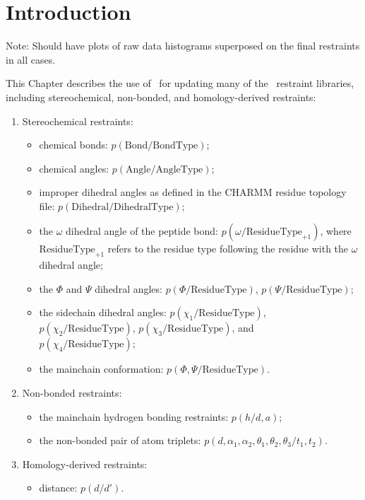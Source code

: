 \section{Introduction}
\label{SECTION:intro}

Note: Should have plots of raw data histograms superposed on the final restraints in all cases.

This Chapter describes the use of \MDT\ for updating many of the \MODELLER\ restraint libraries, including 
stereochemical, non-bonded, and homology-derived restraints:

\begin{enumerate}

\item Stereochemical restraints:

\begin{itemize}
\item chemical bonds: $p(\mbox{Bond}/\mbox{BondType})$;

\item chemical angles: $p(\mbox{Angle}/\mbox{AngleType})$;

\item improper dihedral angles as defined in the CHARMM residue topology file: $p(\mbox{Dihedral}/\mbox{DihedralType})$;

\item the $\omega$ dihedral angle of the peptide bond: $p(\omega/\mbox{ResidueType}_{+1})$, where 
      $\mbox{ResidueType}_{+1}$ refers to the residue type following the residue with the $\omega$ dihedral angle;

\item the $\Phi$ and $\Psi$ dihedral angles: $p(\Phi/\mbox{ResidueType})$, $p(\Psi/\mbox{ResidueType})$;

\item the sidechain dihedral angles: $p(\chi_1/\mbox{ResidueType})$, $p(\chi_2/\mbox{ResidueType})$, 
      $p(\chi_3/\mbox{ResidueType})$, and \\ $p(\chi_4/\mbox{ResidueType})$;

\item the mainchain conformation: $p(\Phi, \Psi/\mbox{ResidueType})$.
\end{itemize}

\item Non-bonded restraints:
\begin{itemize}
\item the mainchain hydrogen bonding restraints: $p(h/d,a)$;

\item the non-bonded pair of atom triplets: $p(d,\alpha_1,\alpha_2,\theta_1,\theta_2,\theta_3/t_1, t_2)$.
\end{itemize}

\item Homology-derived restraints:
\begin{itemize}
\item distance: $p(d/d')$.
\end{itemize}

\end{enumerate}

